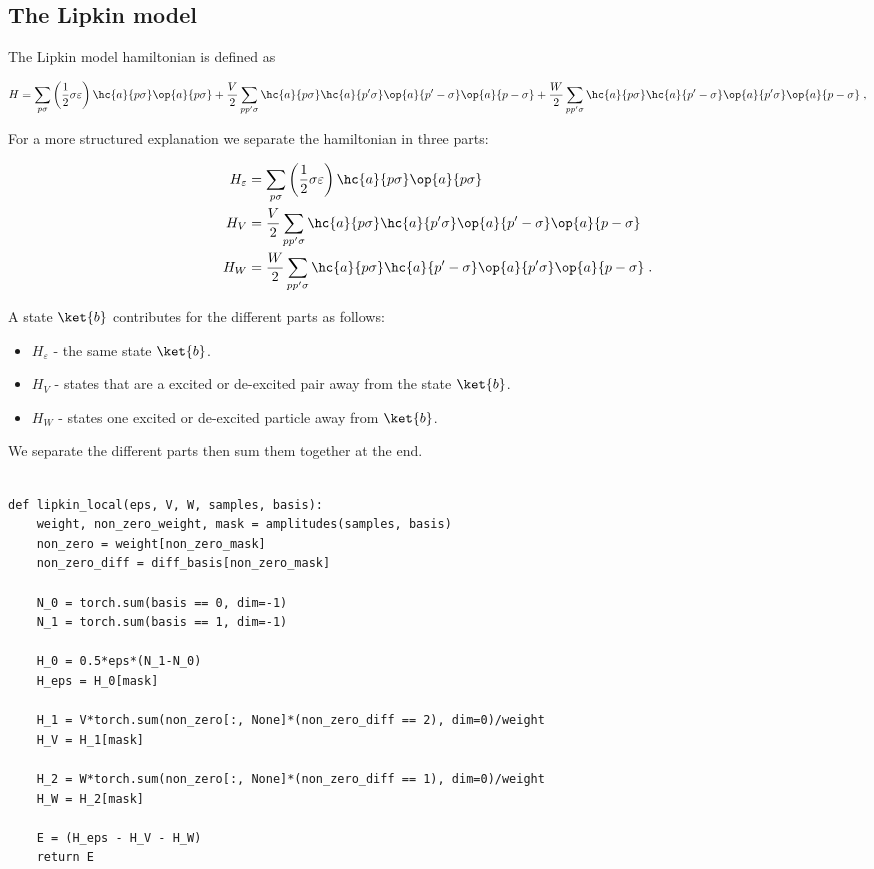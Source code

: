 \subsection{The Lipkin model} \label{section:imp_local}

The Lipkin model hamiltonian is defined as

\begin{equation} 
    H = \sum_{p\sigma} \left ( \frac{1}{2} \sigma \varepsilon \right ) \hc{a}{p\sigma}\op{a}{p\sigma} + \frac{V}{2}\sum_{pp'\sigma} \hc{a}{p\sigma} \hc{a}{p'\sigma} \op{a}{p'-\sigma}\op{a}{p-\sigma} + \frac{W}{2} \sum_{pp'\sigma} \hc{a}{p\sigma} \hc{a}{p'-\sigma} \op{a}{p'\sigma}\op{a}{p-\sigma} \; , 
\end{equation}

For a more structured explanation we separate the hamiltonian in three parts:

\begin{align}
  H_{\varepsilon} &= \sum_{p\sigma} \left ( \frac{1}{2} \sigma \varepsilon \right ) \hc{a}{p\sigma}\op{a}{p\sigma}\\ 
  H_V &= \frac{V}{2}\sum_{pp'\sigma} \hc{a}{p\sigma} \hc{a}{p'\sigma} \op{a}{p'-\sigma}\op{a}{p-\sigma}\\
  H_W &= \frac{W}{2} \sum_{pp'\sigma} \hc{a}{p\sigma} \hc{a}{p'-\sigma} \op{a}{p'\sigma}\op{a}{p-\sigma}  \; .
  \label{eq:LMG_split_H}
\end{align}

 A state $\ket{b}$ contributes for the different parts as follows:

\begin{itemize}
  \item $H_{\varepsilon}$ - the same state $\ket{b}$.
  \item $H_V$ - states that are a excited or de-excited pair away from the state $\ket{b}$.
  \item $H_W$ - states one excited or de-excited particle away from $\ket{b}$.
\end{itemize}

We separate the different parts then sum them together at the end.

\begin{verbatim}

def lipkin_local(eps, V, W, samples, basis):
    weight, non_zero_weight, mask = amplitudes(samples, basis)
    non_zero = weight[non_zero_mask]
    non_zero_diff = diff_basis[non_zero_mask]

    N_0 = torch.sum(basis == 0, dim=-1)
    N_1 = torch.sum(basis == 1, dim=-1)
    
    H_0 = 0.5*eps*(N_1-N_0)
    H_eps = H_0[mask]

    H_1 = V*torch.sum(non_zero[:, None]*(non_zero_diff == 2), dim=0)/weight
    H_V = H_1[mask]
    
    H_2 = W*torch.sum(non_zero[:, None]*(non_zero_diff == 1), dim=0)/weight
    H_W = H_2[mask]
    
    E = (H_eps - H_V - H_W)
    return E

\end{verbatim}

